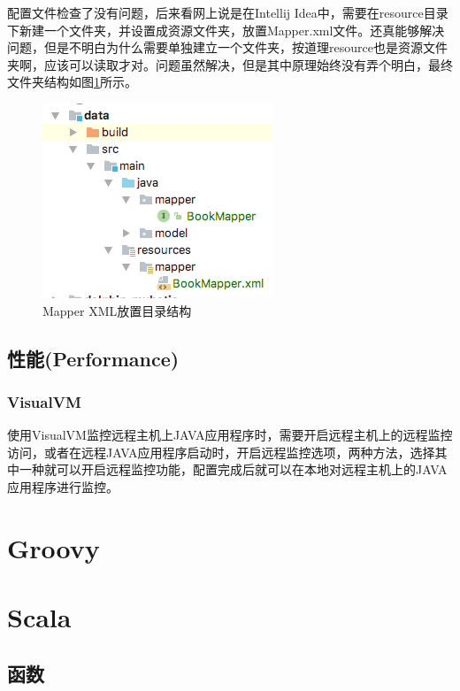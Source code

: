 \documentclass[letter]{book}
\begin{document}
配置文件检查了没有问题，后来看网上说是在Intellij Idea中，需要在resource目录下新建一个文件夹，并设置成资源文件夹，放置Mapper.xml文件。还真能够解决问题，但是不明白为什么需要单独建立一个文件夹，按道理resource也是资源文件夹啊，应该可以读取才对。问题虽然解决，但是其中原理始终没有弄个明白，最终文件夹结构如图\ref{fig:mapperreourcestructure}所示。

\begin{figure}[htbp]
	\centering
	\includegraphics[scale=0.7]{mapperreourcestructure.png}
	\caption{Mapper XML放置目录结构}
	\label{fig:mapperreourcestructure}
\end{figure}


\section{性能(Performance)}



\subsection{VisualVM}

使用VisualVM监控远程主机上JAVA应用程序时，需要开启远程主机上的远程监控访问，或者在远程JAVA应用程序启动时，开启远程监控选项，两种方法，选择其中一种就可以开启远程监控功能，配置完成后就可以在本地对远程主机上的JAVA应用程序进行监控。


\newpage



\chapter{Groovy}

\chapter{Scala}

\section{函数}
\end{document}
